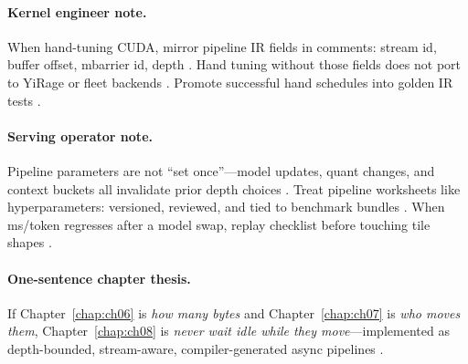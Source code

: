 \paragraph{Kernel engineer note.}
When hand-tuning CUDA, mirror pipeline IR fields in comments: stream id, buffer offset, mbarrier id, depth \citep{nvidia2022hopper,semianalysis2024tma,chen2020compilerbasedhardw}.
Hand tuning without those fields does not port to YiRage or fleet backends \citep{yirage2026,amd2024xdna,patel2025llminference}.
Promote successful hand schedules into golden IR tests \citep{wu2024mirage,shah2024flashattention3,taxbreak2026}.

\paragraph{Serving operator note.}
Pipeline parameters are not ``set once''---model updates, quant changes, and context buckets all invalidate prior depth choices \citep{kwon2023vllm,patel2025llminference,yirage2026}.
Treat pipeline worksheets like hyperparameters: versioned, reviewed, and tied to benchmark bundles \citep{chen2020compilerbasedhardw,taxbreak2026,memoryfloor2026}.
When ms/token regresses after a model swap, replay checklist before touching tile shapes \citep{shah2024flashattention3,dao2022flashattention,mpk2025}.

\paragraph{One-sentence chapter thesis.}
If Chapter~\ref{chap:ch06} is \emph{how many bytes} and Chapter~\ref{chap:ch07} is \emph{who moves them}, Chapter~\ref{chap:ch08} is \emph{never wait idle while they move}---implemented as depth-bounded, stream-aware, compiler-generated async pipelines \citep{dao2022flashattention,shah2024flashattention3,semianalysis2024tma,yirage2026,patel2025llminference,memoryfloor2026,taxbreak2026,chen2020compilerbasedhardw}.

